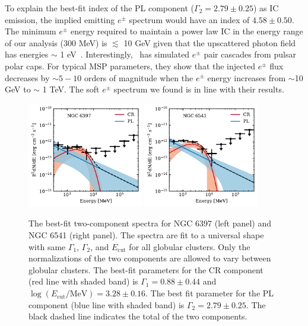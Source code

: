 \documentclass[doublespace,nopageskip]{VTthesis}
\begin{document}
To explain the best-fit index of the {PL} component ($\Gamma_2 = 2.79 \pm 0.25$) {as IC emission}, the implied emitting $e^\pm$ spectrum would have an index of $4.58 \pm 0.50$. The minimum $e^\pm$ energy required to maintain a power law IC in the energy range of our analysis (300 MeV) is $\lesssim$ 10 GeV given that the upscattered photon field has energies $\sim$ 1 eV~\citep{1970RvMP...42..237B}. Interestingly,~\citet{2011ApJ...743..181H} has simulated $e^{\pm}$ pair cascades from pulsar polar caps. For typical MSP parameters, they show that the injected $e^\pm$ flux decreases by $\sim 5 - 10$ orders of magnitude when the $e^\pm$ energy increases from $\sim$10 GeV to $\sim$ 1 TeV. The soft $e^\pm$ spectrum we found is in line with their results.

\begin{figure}[htb]
    \centering
    \includegraphics[width=0.45\textwidth]{Figures/Globular/spectra/2comp_16.pdf}
    \includegraphics[width=0.45\textwidth]{Figures/Globular/spectra/2comp_21.pdf}
    \caption{The best-fit two-component spectra for NGC 6397 (left panel) and NGC 6541 (right panel). The spectra are fit to a universal shape with same $\Gamma_1$, $\Gamma_2$, and $E_\mathrm{cut}$ for all globular clusters.  Only the normalizations of the two components are allowed to vary between globular clusters. The best-fit parameters for the CR component (red line with shaded band) is $\Gamma_1 = 0.88 \pm 0.44$ and $\log(E_\mathrm{cut}/\mathrm{MeV})=3.28 \pm 0.16$. The best fit parameter for the {PL} component (blue line with shaded band) is $\Gamma_2 = 2.79 \pm 0.25$. The black dashed line indicates the total of the two components.}
    \label{fig:global_spectra}
\end{figure}
\end{document}
